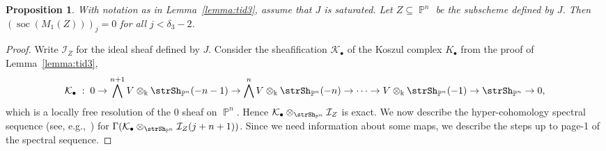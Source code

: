 \documentclass[11pt,a4paper]{amsart}
\theoremstyle{plain}
\newtheorem{proposition}[equation]{Proposition}
\theoremstyle{definition}
\newcommand{\calI}{\mathcal I}
\newcommand{\calK}{\mathcal K}
\DeclareMathOperator{\projective}{\mathbb{P}}
\DeclareMathOperator{\socle}{soc}
\begin{document}
\begin{proposition}
\label{proposition:socM1Z}
With notation as in Lemma~\ref{lemma:tid3}, assume that $J$ is
saturated. Let $Z \subseteq \projective^n$ be the subscheme defined by $J$.
Then $(\socle(M_1(Z)))_j = 0$ for all $j < \delta_3-2$.
\end{proposition}

\begin{proof}
%
Write $\calI_Z$ for the ideal sheaf defined by $J$.
Consider the sheafification $\calK_\bullet$ of the Koszul complex
$K_\bullet$ from the proof of Lemma~\ref{lemma:tid3},
\[
\calK_\bullet\; : \;
0 \rightarrow \bigwedge^{n+1}V \otimes_\Bbbk 
\strSh_{\projective^n}(-n-1) \rightarrow  
\bigwedge^{n}V \otimes_\Bbbk \strSh_{\projective^n}(-n) \rightarrow 
\cdots \rightarrow
V \otimes_\Bbbk \strSh_{\projective^n}(-1) \rightarrow 
\strSh_{\projective^n} \rightarrow  0,
\]
which is a locally free resolution of the $0$ sheaf on ${\projective^n}$.
Hence $\calK_\bullet \otimes_{\strSh_{\projective^n}} \calI_Z$ is exact.
We now describe the hyper-cohomology spectral sequence
(see, e.g.,~\cite[\href{https://stacks.math.columbia.edu/tag/015J}{Tag
015J}]{StacksProject})
for $\Gamma(\calK_\bullet \otimes_{\strSh_{\projective^n}}
\calI_Z(j+n+1))$. Since we need information about some maps, we describe
the steps up to page-1 of the spectral sequence.


\end{proof}
\end{document}
